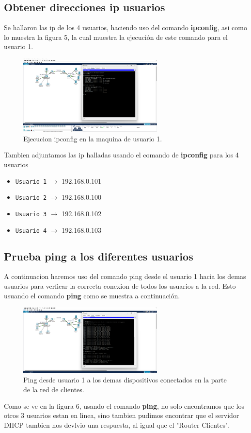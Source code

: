 \documentclass[10pt]{article}
\begin{document}
\subsection{Obtener direcciones ip usuarios}
Se hallaron las ip de los 4 usuarios, haciendo uso del comando \textbf {ipconfig}, asi como lo muestra la figura 5, la cual muestra la ejecución de este comando para el usuario 1.
\begin{figure}[H]
    \centering
    \includegraphics[width=0.65\textwidth]{lab-01-screenshots/43 ipconfig.png}
    \caption{Ejecucion ipconfig en la maquina de usuario 1.}
\end{figure}
 Tambien adjuntamos las ip halladas usando el comando de \textbf{ipconfig} para los 4 usuarios
\begin{itemize}
    \item \texttt{Usuario 1} $\rightarrow$ 192.168.0.101
    \item \texttt{Usuario 2} $\rightarrow$ 192.168.0.100
    \item \texttt{Usuario 3} $\rightarrow$ 192.168.0.102
    \item \texttt{Usuario 4} $\rightarrow$ 192.168.0.103
\end{itemize}
\subsection{Prueba ping a los diferentes usuarios}
A continuacion haremos uso del comando ping desde el usuario 1 hacia los demas usuarios para verficar la correcta conexion de todos los usuarios a la red. Esto usuando el comando \textbf {ping} como se muestra a continuación.
\begin{figure}[H]
    \centering
    \includegraphics[width=0.65\textwidth]{lab-01-screenshots/43 -2-ping-local.png}
    \caption{Ping desde usuario 1 a los demas dispositivos conectados en la parte de la red de clientes.}
\end{figure}
Como se ve en la figura 6, usando el comando \textbf {ping}, no solo encontramos que los otros 3 usuarios estan en linea, sino tambien pudimos encontrar que el servidor DHCP tambien nos devlvio una respuesta, al igual que el "Router Clientes".
\end{document}
